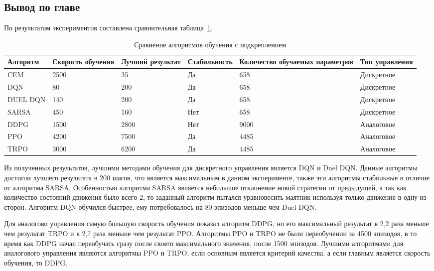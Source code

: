 \subsection{Вывод по главе}
По результатам экспериментов составлена сравнительная \mbox{таблица \ref{table:RLdifference}.}

\begin{table}[H]
	\caption{Сравнение алгоритмов обучения с подкреплением}\label{table:RLdifference}
	\begin{tabular}{|m{2.5cm}|m{1.9cm}|m{2cm}|m{3cm}|m{2.5cm}|m{2.5cm}|}
		\hline Алгоритм & Скорость обучения & Лучший результат & Стабильность &  Количество обучаемых параметров & Тип управления \\
		\hline CEM       & 2500 & 35   & Да  & 658  & Дискретное \\
		\hline DQN       & 80   & 200  & Да  & 658  & Дискретное \\
		\hline DUEL DQN  & 140  & 200  & Да  & 658  & Дискретное \\
		\hline SARSA     & 450  & 160  & Нет & 658  & Дискретное \\
		\hline DDPG      & 1500 & 2800 & Нет & 9000 & Аналоговое \\
		\hline PPO       & 4200 & 7500 & Да  & 4485 & Аналоговое \\
		\hline TRPO      & 3000 & 6200 & Да  & 4485 & Аналоговое \\
		\hline 
	\end{tabular}
\end{table}

Из полученных результатов, лучшими методами обучения для дискретного управления является DQN и Duel DQN. 
Данные алгоритмы достигли лучшего результата в 200 шагов, что является максимальным в данном эксперименте, также эти алгоритмы стабильные в отличие от алгоритма SARSA.  
Особенностью алгоритма SARSA является небольшое отклонение новой стратегии от предыдущей, а так как количество состояний движения было всего 2, то заданный алгоритм пытался уравновесить маятник используя только движение в одну из сторон.
Алгоритм DQN обучился быстрее, ему потребовалось на 80 эпизодов меньше чем Duel DQN.

Для аналогово управления самую большую скорость обучения показал алгоритм DDPG, но его максимальный результат в 2,2 раза меньше чем результат TRPO и в 2,7 раза меньше чем результат PPO.
Алгоритмы PPO и TRPO не были переобучении за 4500 эпизодов, в то время как DDPG начал переобучать сразу после своего максимального значения, после 1500 эпизодов. 
Лучшими алгоритмами для аналогового управления являются алгоритмы PPO и TRPO, если основным является критерий качества, а если главным является скорость обучения, то DDPG.

\clearpage
